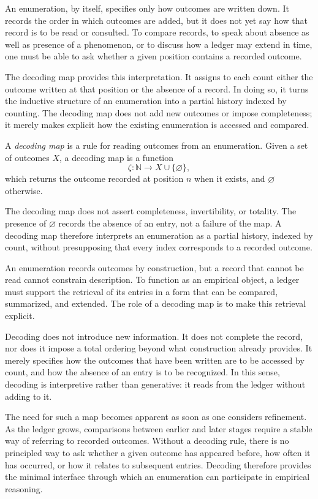 An enumeration, by itself, specifies only how outcomes are written down. It
records the order in which outcomes are added, but it does not yet say how that
record is to be read or consulted. To compare records, to speak about absence as
well as presence of a phenomenon, or to discuss how a ledger may extend in time, one must be
able to ask whether a given position contains a recorded outcome.

The decoding map provides this interpretation. It assigns to each count either
the outcome written at that position or the absence of a record. In doing so, it
turns the inductive structure of an enumeration into a partial history indexed
by counting. The decoding map does not add new outcomes or impose completeness;
it merely makes explicit how the existing enumeration is accessed and compared.

\begin{definition}
A \emph{decoding map} is a rule for reading outcomes from an enumeration. Given a
set of outcomes $X$, a decoding map is a function
\[
\zeta : \mathbb{N} \to X \cup \{\varnothing\},
\]
which returns the outcome recorded at position $n$ when it exists, and
$\varnothing$ otherwise.

The decoding map does not assert completeness, invertibility, or totality. The
presence of $\varnothing$ records the absence of an entry, not a failure of the
map. A decoding map therefore interprets an enumeration as a partial history,
indexed by count, without presupposing that every index corresponds to a
recorded outcome.
\end{definition}

An enumeration records outcomes by construction, but a record that cannot be
read cannot constrain description. To function as an empirical object, a ledger
must support the retrieval of its entries in a form that can be compared,
summarized, and extended. The role of a decoding map is to make this retrieval
explicit.

Decoding does not introduce new information. It does not complete the record, nor
does it impose a total ordering beyond what construction already provides. It
merely specifies how the outcomes that have been written are to be accessed by
count, and how the absence of an entry is to be recognized. In this sense,
decoding is interpretive rather than generative: it reads from the ledger
without adding to it.

The need for such a map becomes apparent as soon as one considers refinement.
As the ledger grows, comparisons between earlier and later stages require a
stable way of referring to recorded outcomes. Without a decoding rule, there is
no principled way to ask whether a given outcome has appeared before, how often
it has occurred, or how it relates to subsequent entries. Decoding therefore
provides the minimal interface through which an enumeration can participate in
empirical reasoning.


